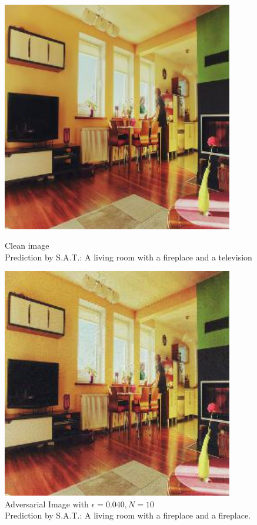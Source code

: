 \begin{figure}[ht]
    \centering
    \begin{minipage}{0.45\textwidth}
        \centering
        \includegraphics[width=0.9\textwidth]{../code/ShowDistractAndDeceive/samples/0.000/img_0.jpg} %
        \caption*{Clean image\\Prediction by S.A.T.: A living room with a fireplace and a television}
    \end{minipage}\hfill
    \begin{minipage}{0.45\textwidth}
        \centering
        \includegraphics[width=0.9\textwidth]{../code/ShowDistractAndDeceive/samples/0.040/img_0.jpg} %
        \caption*{Adversarial Image with $\epsilon=0.040, N=10$\\Prediction by S.A.T.: A living room with a fireplace and a fireplace.}
    \end{minipage}
\end{figure}

